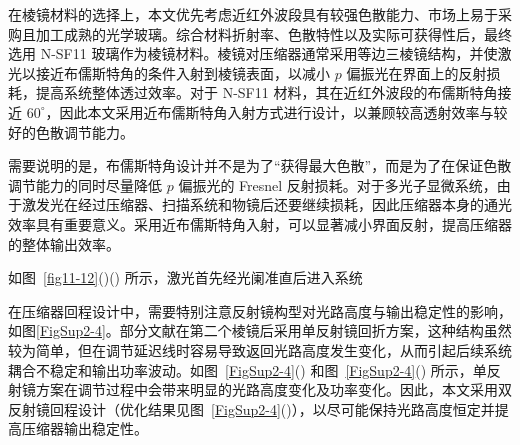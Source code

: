 在棱镜材料的选择上，本文优先考虑近红外波段具有较强色散能力、市场上易于采购且加工成熟的光学玻璃。综合材料折射率、色散特性以及实际可获得性后，最终选用 N-SF11 玻璃作为棱镜材料。棱镜对压缩器通常采用等边三棱镜结构，并使激光以接近布儒斯特角的条件入射到棱镜表面，以减小 $p$ 偏振光在界面上的反射损耗，提高系统整体透过效率。对于 N-SF11 材料，其在近红外波段的布儒斯特角接近 $60^\circ$，因此本文采用近布儒斯特角入射方式进行设计，以兼顾较高透射效率与较好的色散调节能力。

需要说明的是，布儒斯特角设计并不是为了``获得最大色散''，而是为了在保证色散调节能力的同时尽量降低 $p$ 偏振光的 Fresnel 反射损耗。对于多光子显微系统，由于激发光在经过压缩器、扫描系统和物镜后还要继续损耗，因此压缩器本身的通光效率具有重要意义。采用近布儒斯特角入射，可以显著减小界面反射，提高压缩器的整体输出效率。

如图~\ref{fig11-12}()() 所示，激光首先经光阑准直后进入系统

在压缩器回程设计中，需要特别注意反射镜构型对光路高度与输出稳定性的影响，如图\ref{FigSup2-4}。部分文献在第二个棱镜后采用单反射镜回折方案，这种结构虽然较为简单，但在调节延迟线时容易导致返回光路高度发生变化，从而引起后续系统耦合不稳定和输出功率波动。如图~\ref{FigSup2-4}() 和图~\ref{FigSup2-4}() 所示，单反射镜方案在调节过程中会带来明显的光路高度变化及功率变化。因此，本文采用双反射镜回程设计（优化结果见图~\ref{FigSup2-4}()），以尽可能保持光路高度恒定并提高压缩器输出稳定性。

